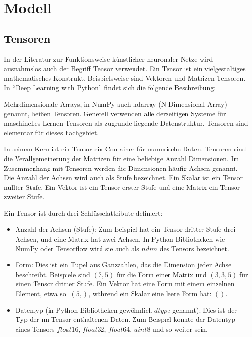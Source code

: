 \chapter{Modell}
\label{ch:model}

\section{Tensoren}
In der Literatur zur Funktionsweise künstlicher neuronaler Netze wird ausnahmslos auch der Begriff Tensor verwendet. Ein Tensor ist ein vielgestaltiges mathematisches Konstrukt. Beispielsweise sind Vektoren und Matrizen Tensoren. In ``Deep Learning with Python'' \cite{chollet2021deep} findet sich die folgende Beschreibung:

Mehrdimensionale Arrays, in NumPy auch ndarray (N-Dimensional Array) genannt, heißen Tensoren. Generell verwenden alle derzeitigen Systeme für maschinelles Lernen Tensoren als zugrunde liegende Datenstruktur. Tensoren sind elementar für dieses Fachgebiet.

In seinem Kern ist ein Tensor ein Container für numerische Daten. Tensoren sind die Verallgemeinerung der Matrizen für eine beliebige Anzahl Dimensionen. Im Zusammenhang mit Tensoren werden die Dimensionen häufig Achsen genannt. Die Anzahl der Achsen wird auch als Stufe bezeichnet. Ein Skalar ist ein Tensor nullter Stufe. Ein Vektor ist ein Tensor erster Stufe und eine Matrix ein Tensor zweiter Stufe.

Ein Tensor ist durch drei Schlüsselattribute definiert:
\begin{itemize}
\item Anzahl der Achsen (Stufe): Zum Beispiel hat ein Tensor dritter Stufe drei Achsen, und eine Matrix hat zwei Achsen. In Python-Bibliotheken wie NumPy oder Tensorflow wird sie auch als $ndim$ des Tensors bezeichnet.
\item Form: Dies ist ein Tupel aus Ganzzahlen, das die Dimension jeder Achse beschreibt. Beispiele sind $(3, 5)$ für die Form einer Matrix und $(3, 3, 5)$ für einen Tensor dritter Stufe. Ein Vektor hat eine Form mit einem einzelnen Element, etwa so: $(5,)$, während ein Skalar eine leere Form hat: $()$.
\item Datentyp (in Python-Bibliotheken gewöhnlich $dtype$ genannt): Dies ist der Typ der im Tensor enthaltenen Daten. Zum Beispiel könnte der Datentyp eines Tensors $float16$, $float32$, $float64$, $uint8$ und so weiter sein.
\end{itemize}
\cite{chollet2021deep}


